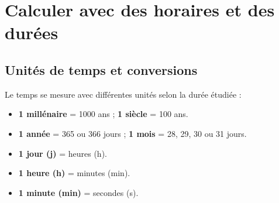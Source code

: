 \documentclass[a4paper]{book}
\begin{document}
\setcounter{chapter}{11} 
\renewcommand{\monTitre}{Calculer avec des horaires et des durées}
\chapter{\monTitre}
\thispagestyle{fancy}


\section{Unités de temps et conversions}

    \begin{definition}
        Le temps se mesure avec différentes unités selon la durée étudiée :
        \begin{itemize}
            \item \textbf{1 millénaire} = 1000 ans \quad ; \quad \textbf{1 siècle} = 100 ans.
            \item \textbf{1 année} = 365 ou 366 jours \quad ; \quad \textbf{1 mois} = 28, 29, 30 ou 31 jours.
            \item \textbf{1 jour (j)} = \points[5] heures (h).
            \item \textbf{1 heure (h)} = \points[5] minutes (min).
            \item \textbf{1 minute (min)} = \points[5] secondes (s).
        \end{itemize}
    \end{definition}
    
\end{document}
